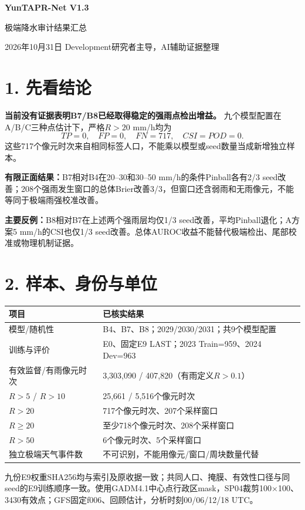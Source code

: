 \documentclass[UTF8,a4paper,10pt,fontset=none]{ctexart}
\newcommand{\result}[1]{\textcolor{ink}{\textbf{#1}}}
\begin{document}
{\LARGE\bfseries YunTAPR-Net V1.3}\par
{\Large 极端降水审计结果汇总}\par
2026年10月31日 Development\quad 研究者主导，AI辅助证据整理

\section*{1. 先看结论}
\result{当前没有证据表明B7/B8已经取得稳定的强雨点检出增益。}
九个模型配置在A/B/C三种点估计下，严格$R>20$ mm/h均为
\[
 TP=0,\quad FP=0,\quad FN=717,\quad CSI=POD=0.
\]
这些717个像元时次来自相同标签人口，不能乘以模型或seed数量当成新增独立样本。

\textbf{有限正面结果：}B7相对B4在20--30和30--50 mm/h的条件Pinball各有2/3 seed改善；208个强雨发生窗口的总体Brier改善3/3，但窗口还含弱雨和无雨像元，不能等同于极端雨强校准改善。

\textbf{主要反例：}B8相对B7在上述两个强雨层均仅1/3 seed改善，平均Pinball退化；A方案5 mm/h的CSI也仅1/3 seed改善。总体AUROC收益不能替代极端检出、尾部校准或物理机制证据。

\section*{2. 样本、身份与单位}
\begin{center}
\small
\begin{tabular}{@{}lp{116mm}@{}}
\toprule
项目 & 已核实结果 \\
\midrule
模型/随机性 & B4、B7、B8；2029/2030/2031；共9个模型配置 \\
训练与评价 & E0、固定E9 LAST；2023 Train=959、2024 Dev=963 \\
有效监督/有雨像元时次 & 3,303,090 / 407,820（有雨定义$R>0.1$） \\
$R>5$ / $R>10$ & 25,661 / 5,516个像元时次 \\
$R>20$ & 717个像元时次、207个采样窗口 \\
$R\ge20$ & 至少718个像元时次、208个采样窗口 \\
$R>50$ & 6个像元时次、5个采样窗口 \\
独立极端天气事件数 & 不可识别，不能用像元/窗口/周块数量代替 \\
\bottomrule
\end{tabular}
\end{center}

九份E9权重SHA256均与索引及原收据一致；共同人口、掩膜、有效性口径与同seed的E9训练顺序一致。使用GADM4.1中心点行政区mask，SP04裁剪100$\times$100、3430有效点；GFS固定f006、回顾估计，分析时刻00/06/12/18 UTC。
\end{document}
